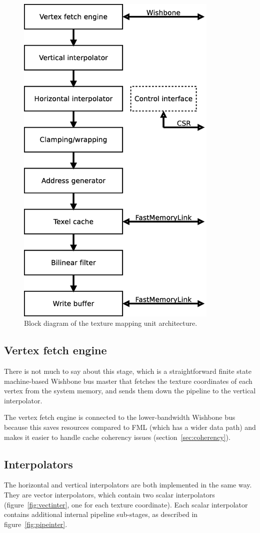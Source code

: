 \documentclass[a4paper,11pt]{kthesis}
\begin{document}
\begin{figure}[htp]
\centering
\includegraphics[height=165mm]{tmublock.eps}
\caption{Block diagram of the texture mapping unit architecture.}
\label{fig:tmublock}
\end{figure}

\subsection{Vertex fetch engine}
There is not much to say about this stage, which is a straightforward finite state machine-based Wishbone bus master that fetches the texture coordinates of each vertex from the system memory, and sends them down the pipeline to the vertical interpolator.

The vertex fetch engine is connected to the lower-bandwidth Wishbone bus because this saves resources compared to FML (which has a wider data path) and makes it easier to handle cache coherency issues (section~\ref{sec:coherency}).

\subsection{Interpolators}
The horizontal and vertical interpolators are both implemented in the same way. They are vector interpolators, which contain two scalar interpolators (figure~\ref{fig:vectinter}, one for each texture coordinate). Each scalar interpolator contains additional internal pipeline sub-stages, as described in figure~\ref{fig:pipeinter}.
\end{document}
